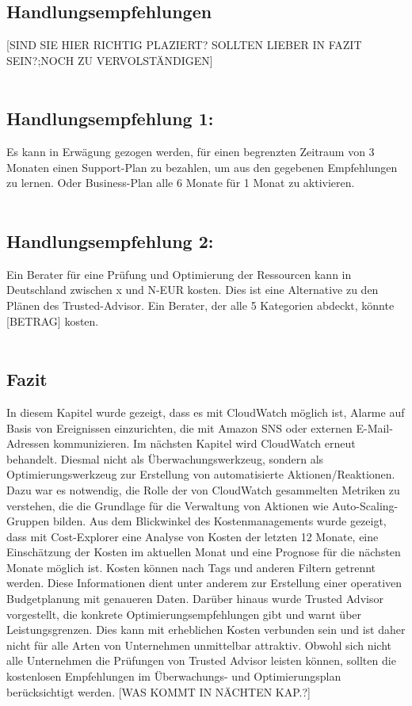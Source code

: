 \subsection*{Handlungsempfehlungen}
[SIND SIE HIER RICHTIG PLAZIERT? SOLLTEN LIEBER IN FAZIT SEIN?;NOCH ZU VERVOLSTÄNDIGEN]
\\\\
\subsection*{Handlungsempfehlung 1:} 
Es kann in Erwägung gezogen werden, für einen begrenzten Zeitraum von 3 Monaten einen Support-Plan zu bezahlen, um aus den gegebenen Empfehlungen zu lernen. Oder Business-Plan alle 6 Monate für 1 Monat zu aktivieren.  
\\\\
\subsection*{Handlungsempfehlung 2:} 
Ein Berater für eine Prüfung und Optimierung der Ressourcen kann in Deutschland zwischen x und N-EUR kosten. Dies ist eine Alternative zu den Plänen des Trusted-Advisor. Ein Berater, der alle 5 Kategorien abdeckt, könnte [BETRAG] kosten. %
\\\\
\subsection*{Fazit}
In diesem Kapitel wurde gezeigt, dass es mit CloudWatch möglich ist, Alarme auf Basis von Ereignissen einzurichten, die mit Amazon SNS oder externen E-Mail-Adressen kommunizieren. Im nächsten Kapitel wird CloudWatch erneut behandelt. Diesmal nicht als Überwachungswerkzeug, sondern als Optimierungswerkzeug zur Erstellung von automatisierte Aktionen/Reaktionen. Dazu war es notwendig, die Rolle der von CloudWatch gesammelten Metriken zu verstehen, die die Grundlage für die Verwaltung von Aktionen wie Auto-Scaling-Gruppen bilden. 
Aus dem Blickwinkel des Kostenmanagements wurde gezeigt, dass mit Cost-Explorer eine Analyse von Kosten der letzten 12 Monate, eine Einschätzung der Kosten im aktuellen Monat und eine Prognose für die nächsten Monate möglich ist. Kosten können nach Tags und anderen Filtern getrennt werden. Diese Informationen dient unter anderem zur Erstellung einer operativen Budgetplanung mit genaueren Daten.
Darüber hinaus wurde Trusted Advisor vorgestellt, die konkrete Optimierungsempfehlungen gibt und warnt über Leistungsgrenzen. Dies kann mit erheblichen Kosten verbunden sein und ist daher nicht für alle Arten von Unternehmen unmittelbar attraktiv. Obwohl sich nicht alle Unternehmen die Prüfungen von Trusted Advisor leisten können, sollten die kostenlosen Empfehlungen im Überwachungs- und Optimierungsplan berücksichtigt werden.
[WAS KOMMT IN NÄCHTEN KAP.?]

